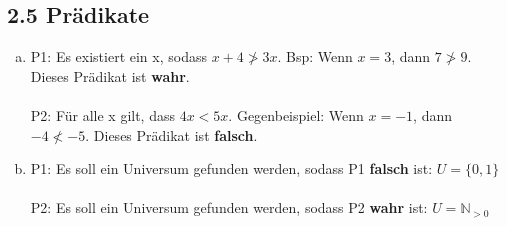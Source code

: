 \documentclass[12pt,a4paper]{article}
\begin{document}
\subsection*{2.5 Prädikate}
\begin{enumerate}[a)]
\item
P1: Es existiert ein x, sodass $x+4 \ngtr 3x$. Bsp: Wenn $x=3$, dann $7 \ngtr 9$. Dieses Prädikat ist \textbf{wahr}.\\
\\
P2: Für alle x gilt, dass $4x < 5x$. Gegenbeispiel: Wenn $x = -1$, dann $-4 \nless -5$. Dieses Prädikat ist \textbf{falsch}.
\item P1: Es soll ein Universum gefunden werden, sodass P1 \textbf{falsch} ist: $ U = \{0,1\}$\\
\\
P2: Es soll ein Universum gefunden werden, sodass P2 \textbf{wahr} ist: $U= \mathbb{N}_{>0}$
\end{enumerate}
\end{document}
